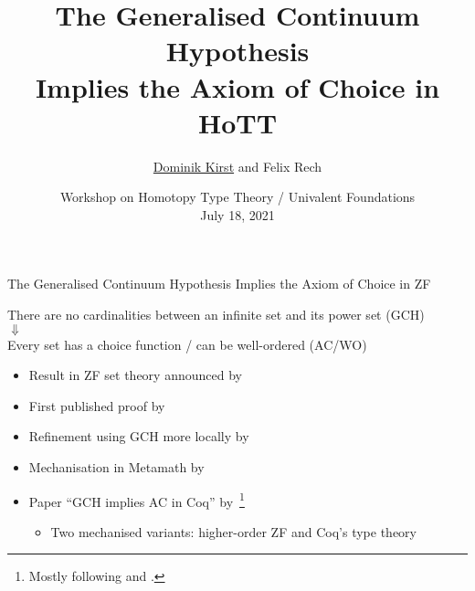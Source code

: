 \documentclass[xcolor=dvipsnames,compress,aspectratio=169]{beamer}
\title[GCH Implies AC in HoTT]{The Generalised Continuum Hypothesis\\Implies the Axiom of Choice in HoTT}
\author[\underline{Dominik Kirst} and Felix Rech]{\underline{Dominik Kirst} and Felix Rech}
\date[HoTT/UF'21]{Workshop on Homotopy Type Theory / Univalent Foundations\\July 18, 2021}
\newcommand{\nologo}{\setbeamertemplate{logo}{}} %
\begin{document}
\renewcommand{\emph}[1]{\textcolor{sb@mcyan}{#1}}

\newcommand\refs[1]{%
	\begin{textblock*}{8cm}(0.3cm,9.2cm)%
		\scriptsize {\color{gray}#1}
	\end{textblock*}
}



\nologo
\begin{frame}
	\maketitle
\end{frame}

\let\footnoterule\relax

\begin{frame}{The Generalised Continuum Hypothesis Implies the Axiom of Choice in ZF}
	\pause
	\begin{centering}
		\begin{widerbox}
			\center
			There are no cardinalities between an infinite set and its power set (GCH)\\
			\vspace{0.1cm}
			$\Downarrow$\\
			\vspace{0.1cm}
			Every set has a choice function / can be well-ordered (AC/WO)
		\end{widerbox}
	\end{centering}

	\pause
	\vspace{0.2cm}
	\begin{itemize}
		\item
		Result in ZF set theory announced by~\cite{lindenbaum_communication_1926}
		\vspace{0.1cm}
		\item
		First published proof by~\cite{sierpinski1947}
		\vspace{0.1cm}
		\item
		Refinement using GCH more locally by~\cite{specker_verallgemeinerte_1990}
		\pause
		\vspace{0.2cm}
		\item
		Mechanisation in Metamath by~\cite{carneiro_gch_2015}
		\vspace{0.1cm}
		\item
		Paper ``GCH implies AC in Coq'' by~\cite{kirst2021generalised}\footnote<4->{Mostly following \cite{gillman2002} and \cite{smullyan2010}.}
		\begin{itemize}
			\item
			Two mechanised variants: higher-order ZF and Coq's type theory
		\end{itemize}
	\end{itemize}
\end{frame}
\end{document}
